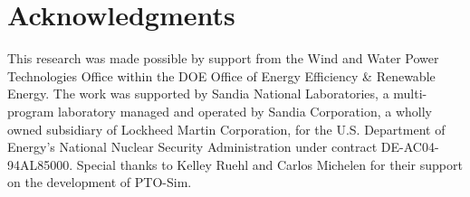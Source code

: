 \documentclass[conference]{IEEEtran}
\begin{document}
\section{Acknowledgments}
This research was made possible by support from the Wind and Water Power Technologies Office within the DOE Office of Energy Efficiency \& Renewable Energy. The work was supported by Sandia National Laboratories, a multi-program laboratory managed and operated by Sandia Corporation, a wholly owned subsidiary of Lockheed Martin Corporation, for the U.S. Department of Energy's National Nuclear Security Administration under contract DE-AC04-94AL85000.  Special thanks to Kelley Ruehl and Carlos Michelen for their support on the development of PTO-Sim.


  
\end{document}
